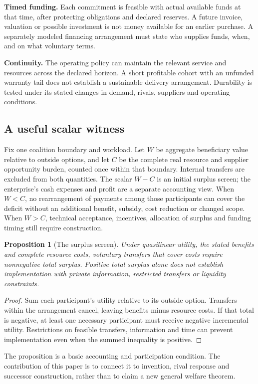 \documentclass[11pt,letterpaper]{article}
\newtheorem{proposition}{Proposition}\newtheorem{definition}{Definition}
\begin{document}
\textbf{Timed funding.} Each commitment is feasible with actual available funds at that time, after protecting obligations and declared reserves. A future invoice, valuation or possible investment is not money available for an earlier purchase. A separately modeled financing arrangement must state who supplies funds, when, and on what voluntary terms.

\textbf{Continuity.} The operating policy can maintain the relevant service and resources across the declared horizon. A short profitable cohort with an unfunded warranty tail does not establish a sustainable delivery arrangement. Durability is tested under its stated changes in demand, rivals, suppliers and operating conditions.

\subsection{A useful scalar witness}
Fix one coalition boundary and workload. Let $W$ be aggregate beneficiary value relative to outside options, and let $C$ be the complete real resource and supplier opportunity burden, counted once within that boundary. Internal transfers are excluded from both quantities. The scalar $W-C$ is an initial surplus screen; the enterprise's cash expenses and profit are a separate accounting view. When $W<C$, no rearrangement of payments among those participants can cover the deficit without an additional benefit, subsidy, cost reduction or changed scope. When $W>C$, technical acceptance, incentives, allocation of surplus and funding timing still require construction.

\begin{proposition}[The surplus screen]
Under quasilinear utility, the stated benefits and complete resource costs, voluntary transfers that cover costs require nonnegative total surplus. Positive total surplus alone does not establish implementation with private information, restricted transfers or liquidity constraints.
\end{proposition}
\begin{proof}
Sum each participant's utility relative to its outside option. Transfers within the arrangement cancel, leaving benefits minus resource costs. If that total is negative, at least one necessary participant must receive negative incremental utility. Restrictions on feasible transfers, information and time can prevent implementation even when the summed inequality is positive.
\end{proof}
The proposition is a basic accounting and participation condition. The contribution of this paper is to connect it to invention, rival response and successor construction, rather than to claim a new general welfare theorem.
\end{document}
